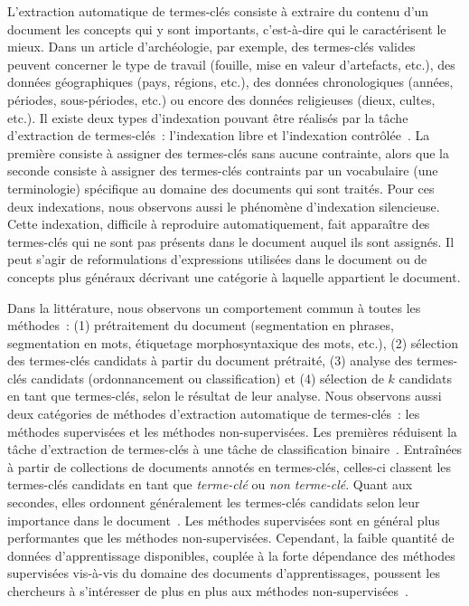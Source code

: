       L'extraction automatique de termes-clés consiste à extraire du contenu
      d'un document les concepts qui y sont importants, c'est-à-dire qui le
      caractérisent le mieux. Dans un article d'archéologie, par exemple, des
      termes-clés valides peuvent concerner le type de travail (fouille, mise en
      valeur d'artefacts, etc.), des données géographiques (pays, régions,
      etc.), des données chronologiques (années, périodes, sous-périodes, etc.)
      ou encore des données religieuses (dieux, cultes, etc.). Il existe deux
      types d'indexation pouvant être réalisés par la tâche d'extraction de
      termes-clés~: l'indexation libre et l'indexation
      contrôlée~\citep{paroubek2012deft}. La première consiste à assigner des
      termes-clés sans aucune contrainte, alors que la seconde consiste à
      assigner des termes-clés contraints par un vocabulaire (une terminologie)
      spécifique au domaine des documents qui sont traités. Pour ces deux
      indexations, nous observons aussi le phénomène d'indexation silencieuse.
      Cette indexation, difficile à reproduire automatiquement, fait apparaître
      des termes-clés qui ne sont pas présents dans le document auquel ils sont
      assignés. Il peut s'agir de reformulations d'expressions utilisées dans le
      document ou de concepts plus généraux décrivant une catégorie à laquelle
      appartient le document.

      Dans la littérature, nous observons un comportement commun à toutes les
      méthodes~: (1) prétraitement du document (segmentation en phrases,
      segmentation en mots, étiquetage morphosyntaxique des mots, etc.), (2)
      sélection des termes-clés candidats à partir du document prétraité, (3)
      analyse des termes-clés candidats (ordonnancement ou classification) et
      (4) sélection de $k$ candidats en tant que termes-clés, selon le résultat
      de leur analyse. Nous observons aussi deux catégories de méthodes
      d'extraction automatique de termes-clés~: les méthodes supervisées et les
      méthodes non-supervisées. Les premières réduisent la tâche d'extraction de
      termes-clés à une tâche de classification binaire~\citep{witten1999kea}.
      Entraînées à partir de collections de documents annotés en termes-clés,
      celles-ci classent les termes-clés candidats en tant que
      \textit{terme-clé} ou \textit{non terme-clé}. Quant aux secondes, elles
      ordonnent généralement les termes-clés candidats selon leur importance
      dans le document~\citep{wan2008expandrank}. Les méthodes supervisées sont
      en général plus performantes que les méthodes non-supervisées. Cependant,
      la faible quantité de données d'apprentissage disponibles, couplée à la
      forte dépendance des méthodes supervisées vis-à-vis du domaine des
      documents d'apprentissages, poussent les chercheurs à s'intéresser de plus
      en plus aux méthodes non-supervisées~\citep{hassan2010conundrums}.

